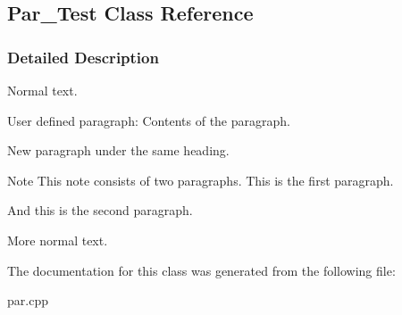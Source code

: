 \hypertarget{class_par___test}{}\subsection{Par\+\_\+\+Test Class Reference}
\label{class_par___test}


\subsubsection{Detailed Description}
Normal text.

\begin{DoxyParagraph}{User defined paragraph\+:}
Contents of the paragraph.
\end{DoxyParagraph}
\begin{DoxyParagraph}{}
New paragraph under the same heading.
\end{DoxyParagraph}
\begin{DoxyNote}{Note}
This note consists of two paragraphs. This is the first paragraph.
\end{DoxyNote}
\begin{DoxyParagraph}{}
And this is the second paragraph.
\end{DoxyParagraph}
More normal text. 

The documentation for this class was generated from the following file\+:\begin{DoxyCompactItemize}
\item 
par.\+cpp\end{DoxyCompactItemize}
